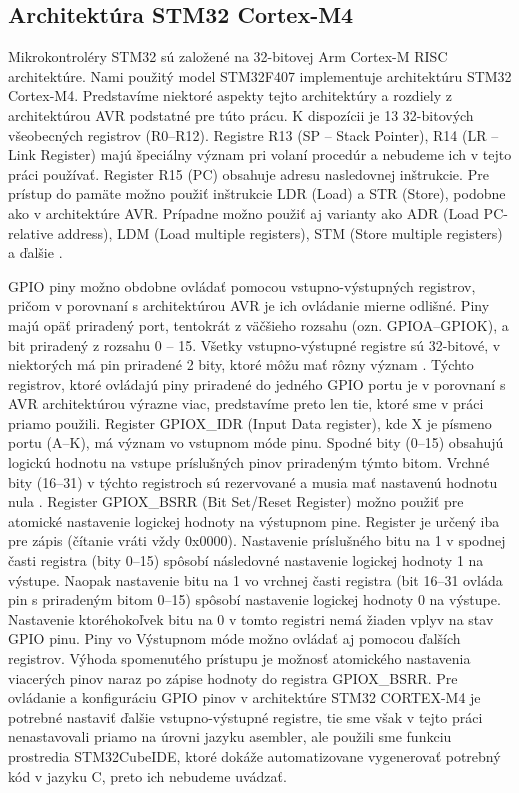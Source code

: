 \subsection{Architektúra STM32 Cortex-M4}
Mikrokontroléry STM32 sú založené na 32-bitovej Arm Cortex-M RISC architektúre. Nami použitý model STM32F407 implementuje architektúru STM32 Cortex-M4. Predstavíme niektoré aspekty tejto architektúry a rozdiely z architektúrou AVR podstatné pre túto prácu. K dispozícii je 13 32-bitových všeobecných registrov (R0--R12). Registre R13 (SP -- Stack Pointer), R14 (LR -- Link Register) majú špeciálny význam pri volaní procedúr \cite{stmInstruction} a nebudeme ich v tejto práci používať. Register R15 (PC) obsahuje adresu nasledovnej inštrukcie. Pre prístup do pamäte možno použiť inštrukcie LDR (Load) a STR (Store), podobne ako v architektúre AVR. Prípadne možno použiť aj varianty ako ADR (Load PC-relative address), LDM (Load multiple registers), STM (Store multiple registers) a ďalšie \cite{stmInstruction}.

GPIO piny možno obdobne ovládať pomocou vstupno-výstupných registrov, pričom v porovnaní s architektúrou AVR je ich ovládanie mierne odlišné. Piny majú opäť priradený port, tentokrát z väčšieho rozsahu (ozn. GPIOA--GPIOK), a bit priradený z rozsahu 0 -- 15. Všetky vstupno-výstupné registre sú 32-bitové, v niektorých má pin priradené 2 bity, ktoré môžu mať rôzny význam \cite{stmReference}. Týchto registrov, ktoré ovládajú piny priradené do jedného GPIO portu je v porovnaní s AVR architektúrou výrazne viac, predstavíme preto len tie, ktoré sme v práci priamo použili. Register GPIOX\_IDR (Input Data register), kde X je písmeno portu (A--K), má význam vo vstupnom móde pinu. Spodné bity (0--15) obsahujú logickú hodnotu na vstupe príslušných pinov priradeným týmto bitom. Vrchné bity (16--31) v týchto registroch sú rezervované a musia mať nastavenú hodnotu nula \cite{stmReference}. Register GPIOX\_BSRR (Bit Set/Reset Register) možno použiť pre atomické nastavenie logickej hodnoty na výstupnom pine. Register je určený iba pre zápis (čítanie vráti vždy 0x0000). Nastavenie príslušného bitu na 1 v spodnej časti registra (bity 0--15) spôsobí následovné nastavenie logickej hodnoty 1 na výstupe. Naopak nastavenie bitu na 1 vo vrchnej časti registra (bit 16--31 ovláda pin s priradeným bitom 0--15) spôsobí nastavenie logickej hodnoty 0 na výstupe. Nastavenie ktoréhokoľvek bitu na 0 v tomto registri nemá žiaden vplyv na stav GPIO pinu. Piny vo Výstupnom móde možno ovládať aj pomocou ďalších registrov. Výhoda spomenutého prístupu je možnosť atomického nastavenia viacerých pinov naraz po zápise hodnoty do registra GPIOX\_BSRR. Pre ovládanie a konfiguráciu GPIO pinov v architektúre STM32 CORTEX-M4 je potrebné nastaviť ďalšie vstupno-výstupné registre, tie sme však v tejto práci nenastavovali priamo na úrovni jazyku asembler, ale použili sme funkciu prostredia STM32CubeIDE, ktoré dokáže automatizovane vygenerovať potrebný kód v jazyku C, preto ich nebudeme uvádzať.

